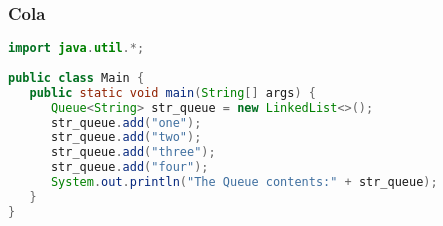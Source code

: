 \subsubsection{Cola}
\begin{lstlisting}[language=Java]
import java.util.*;
	
public class Main {
   public static void main(String[] args) {
      Queue<String> str_queue = new LinkedList<>();
      str_queue.add("one");
      str_queue.add("two");
      str_queue.add("three");
      str_queue.add("four");
      System.out.println("The Queue contents:" + str_queue);
   }
}
\end{lstlisting}
